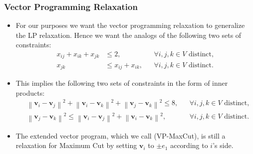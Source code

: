 \documentclass{beamer}
\begin{document}
    \begin{frame}
        \frametitle{Vector Programming Relaxation}
    
        \begin{itemize}
            \item For our purposes we want the vector programming relaxation to generalize the LP relaxation. Hence we want the analogs of the following two sets of constraints:
            \begin{align*}
                x_{ij} + x_{ik} + x_{jk} &\leq 2, && \forall i, j, k \in V \text{ distinct}, \\
                x_{jk} &\leq x_{ij} + x_{ik}, && \forall i, j, k \in V \text{ distinct}.
            \end{align*}
            \pause
            \vspace{-1em}
            \item This implies the following two sets of constraints in the form of inner products:
            {\small
                \begin{align*}
                    &\left\lVert \mathbf v_i - \mathbf v_j \right\rVert^2 + \left\lVert \mathbf v_i - \mathbf v_k \right\rVert^2 + \left\lVert \mathbf v_j - \mathbf v_k \right\rVert^2 \leq 8, && \forall i, j, k \in V \text{ distinct}, \\
                    &\left\lVert \mathbf v_j - \mathbf v_k \right\rVert^2 \leq \left\lVert \mathbf v_i - \mathbf v_j \right\rVert^2 + \left\lVert \mathbf v_i - \mathbf v_k \right\rVert^2, && \forall i, j, k \in V \text{ distinct}.
                \end{align*}
            }
            \pause
            \vspace{-1em}
            \item The extended vector program, which we call {\sc (VP-MaxCut)}, is still a relaxation for {\sc Maximum Cut} by setting $\mathbf v_i$ to $\pm e_1$ according to $i$'s side.
        \end{itemize}
    \end{frame}
\end{document}
